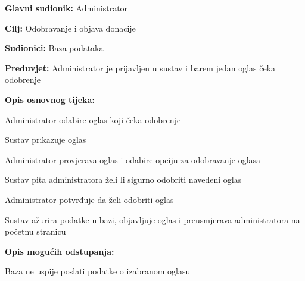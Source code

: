 					\noindent {}
					\begin{packed_item}
	
						\item \textbf{Glavni sudionik: }Administrator
						\item  \textbf{Cilj:} Odobravanje i objava donacije
						\item  \textbf{Sudionici:} Baza podataka
						\item  \textbf{Preduvjet:} Administrator je prijavljen u sustav i barem jedan oglas čeka odobrenje
						\item  \textbf{Opis osnovnog tijeka:}
						
						\item[] \begin{packed_enum}
							\item Administrator odabire oglas koji čeka odobrenje
							\item Sustav prikazuje oglas
							\item Administrator provjerava oglas i odabire opciju za odobravanje oglasa
							\item Sustav pita administratora želi li sigurno odobriti navedeni oglas
							\item Administrator potvrđuje da želi odobriti oglas
							\item Sustav ažurira podatke u bazi, objavljuje oglas i preusmjerava administratora na početnu stranicu
						\end{packed_enum}

						\item  \textbf{Opis mogućih odstupanja:}

						\item[] \begin{packed_item}
							\item[2.a] Baza ne uspije poslati podatke o izabranom oglasu
							\item[] \begin{packed_enum}
								

\end{packed_enum}
\end{packed_item}
\end{packed_item}
